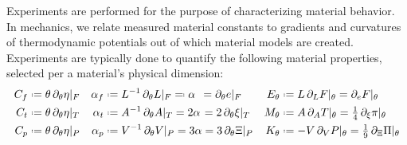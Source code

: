 Experiments are performed for the purpose of characterizing material behavior.  In mechanics, we relate measured material constants to gradients and curvatures of thermo\-dynamic potentials out of which material models are created.  Experiments are typically done to quantify the following material properties, selected per a material's physical dimension:
\begin{subequations}
\label{materialConstants}
\begin{align}
C_f & \defeq \theta \, \partial_{\theta} \eta |_F & 
\alpha_f & \defeq L^{-1} \, \partial_{\theta} L |_F \eqdef \alpha \:\: =
\partial_{\theta} e |_F &
E_{\theta} & \defeq L \, \partial_L F |_{\theta} = 
\partial_e F |_{\theta} \\
C_t & \defeq \theta \, \partial_{\theta} \eta |_T & 
\alpha_t & \defeq A^{-1} \, \partial_{\theta} A |_T = 2 \alpha \hspace{1pt} =
2 \, \partial_{\theta} \xi |_T &
M_{\theta} & \defeq A \, \partial_A T |_{\theta} = 
\tfrac{1}{4} \, \partial_{\xi} \pi |_{\theta} \\
C_p & \defeq \theta \, \partial_{\theta} \eta |_P & 
\alpha_p & \defeq V^{-1} \, \partial_{\theta} V |_P = 3 \alpha =
3 \, \partial_{\theta} \Xi |_P &
K_{\theta} & \defeq -V \, \partial_V P |_{\theta} = 
\tfrac{1}{9} \, \partial_{\Xi} \Pi |_{\theta}
\end{align}
\end{subequations}

